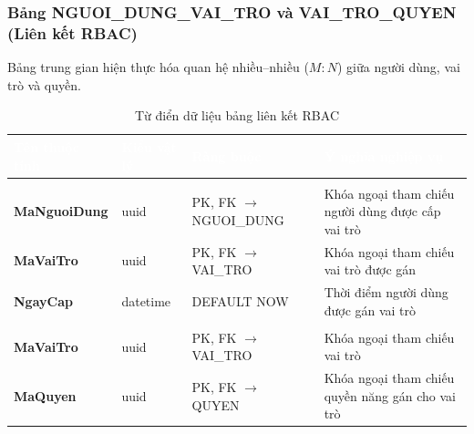 \subsubsection{Bảng NGUOI\_DUNG\_VAI\_TRO và VAI\_TRO\_QUYEN (Liên kết RBAC)}
Bảng trung gian hiện thực hóa quan hệ nhiều--nhiều ($M:N$) giữa người dùng, vai trò và quyền.
\begin{table}[H]
\centering\small
\renewcommand{\arraystretch}{1.3}
\begin{tabularx}{\textwidth}{|>{\raggedright\arraybackslash\bfseries}p{3.2cm}|>{\raggedright\arraybackslash}p{2.3cm}|>{\raggedright\arraybackslash}p{3.2cm}|>{\raggedright\arraybackslash}X|}
\hline
\rowcolor{tableheader}
\textcolor{white}{\textbf{Tên thuộc tính}} & \textcolor{white}{\textbf{Kiểu vật lý}} & \textcolor{white}{\textbf{Ràng buộc}} & \textcolor{white}{\textbf{Ý nghĩa nghiệp vụ}} \\
\hline
\multicolumn{4}{|l|}{\cellcolor{softblue}\textbf{Bảng NGUOI\_DUNG\_VAI\_TRO}} \\
\hline
MaNguoiDung & uuid & PK, FK $\to$ NGUOI\_DUNG & Khóa ngoại tham chiếu người dùng được cấp vai trò \\
\hline
MaVaiTro & uuid & PK, FK $\to$ VAI\_TRO & Khóa ngoại tham chiếu vai trò được gán \\
\hline
NgayCap & datetime & DEFAULT NOW & Thời điểm người dùng được gán vai trò \\
\hline
\multicolumn{4}{|l|}{\cellcolor{softblue}\textbf{Bảng VAI\_TRO\_QUYEN}} \\
\hline
MaVaiTro & uuid & PK, FK $\to$ VAI\_TRO & Khóa ngoại tham chiếu vai trò \\
\hline
MaQuyen & uuid & PK, FK $\to$ QUYEN & Khóa ngoại tham chiếu quyền năng gán cho vai trò \\
\hline
\end{tabularx}
\caption{Từ điển dữ liệu bảng liên kết RBAC}
\label{tab:dict_rbac_junction}
\end{table}

